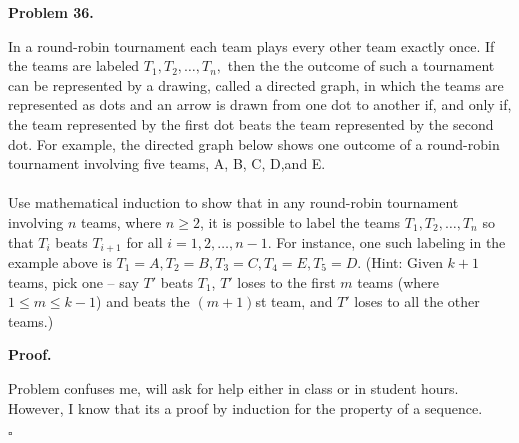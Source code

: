 \documentclass{article}
\newenvironment{problem}[1]{
    \begin{mdframed}[backgroundcolor=gray!20, skipabove=\baselineskip, skipbelow=\baselineskip, nobreak=true, innerleftmargin=10pt, innerrightmargin=10pt, innertopmargin=10pt, innerbottommargin=10pt]
    \textbf{Problem #1.}
}{
    \end{mdframed}
}
\newenvironment{proof}{
    \begin{mdframed}[nobreak=false, innerleftmargin=10pt, innerrightmargin=10pt, innertopmargin=10pt, innerbottommargin=10pt]
    \textbf{Proof.}
}{
    \hfill $\square$
    \end{mdframed}
}
\begin{document}
    \begin{problem}{36}
        In a round-robin tournament each team plays every other team exactly once. If the teams are labeled $T_1, T_2, \ldots, T_n,$ then the the outcome of such a tournament can be represented by a drawing, called a directed graph, in which the teams are represented as dots and an arrow is drawn from one dot to another if, and only if, the team represented by the ﬁrst dot beats the team represented by the second dot. For example, the directed graph below shows one outcome of a round-robin tournament involving ﬁve teams, A, B, C, D,and E. \\ \\
        Use mathematical induction to show that in any round-robin tournament involving $n$ teams, where $n \geq 2$, it is possible to label the teams $T_1, T_2, \ldots, T_n$ so that $T_i$ beats $T_{i+1}$ for all $i = 1, 2, \ldots, n-1$. For instance, one such labeling in the example above is $T_1 = A, T_2 = B, T_3 = C, T_4 = E, T_5 = D$. (Hint: Given $k+1$ teams, pick one -- say $T'$ beats $T_1$, $T'$ loses to the first $m$ teams (where $1 \leq m \leq k-1$) and beats the $(m+1)$st team, and $T'$ loses to all the other teams.)
    \end{problem}
    \begin{proof}
        Problem confuses me, will ask for help either in class or in student hours. However, I know that its a proof by induction for the property of a sequence.
    \end{proof}

\end{document}
